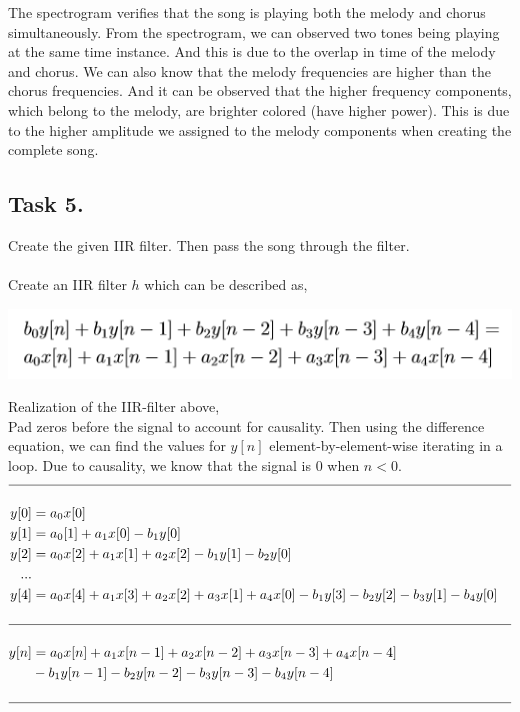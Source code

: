 \documentclass{article}
\begin{document}
        The spectrogram verifies that the song is playing both the melody and chorus simultaneously. From the spectrogram, we can observed two tones being playing at the same time instance. And this is due to the overlap in time of the melody and chorus. We can also know that the melody frequencies are higher than the chorus frequencies. And it can be observed that the higher frequency components, which belong to the melody, are brighter colored (have higher power). This is due to the higher amplitude we assigned to the melody components when creating the complete song.
        
    \subsection{Task 5.} Create the given IIR filter. Then pass the song through the filter.\\
        \vspace{5mm}\\
        Create an IIR filter $h$ which can be described as,
        \begin{center}
            \includegraphics[width=\textwidth]{filter.PNG}
        \end{center}
        \pagebreak
        Realization of the IIR-filter above,\\
        \indent Pad zeros before the signal to account for causality. Then using the difference equation, we can find the values for $y[n]$ element-by-element-wise iterating in a loop. Due to causality, we know that the signal is 0 when $n<0$.
        \begin{align*}
            \hline
            \vspace{2mm}\\
            y[0]&=a_0x[0]\\
            y[1]&=a_0[1]+a_1x[0]-b_1y[0]\\
            y[2]&=a_0x[2]+a_1x[1]+a_2x[2]-b_1y[1]-b_2y[0]\\
            ...\\
            y[4]&=a_0x[4]+a_1x[3]+a_2x[2]+a_3x[1]+a_4x[0]-b_1y[3]-b_2y[2]-b_3y[1]-b_4y[0]\\
            \vspace{2mm}\\
            \hline
            \vspace{2mm}\\
            y[n]&=a_0x[n]+a_1x[n-1]+a_2x[n-2]+a_3x[n-3]+a_4x[n-4]\\
            &-b_1y[n-1]-b_2y[n-2]-b_3y[n-3]-b_4y[n-4]\\
            \vspace{2mm}\\
            \hline
        \end{align*}
\end{document}
